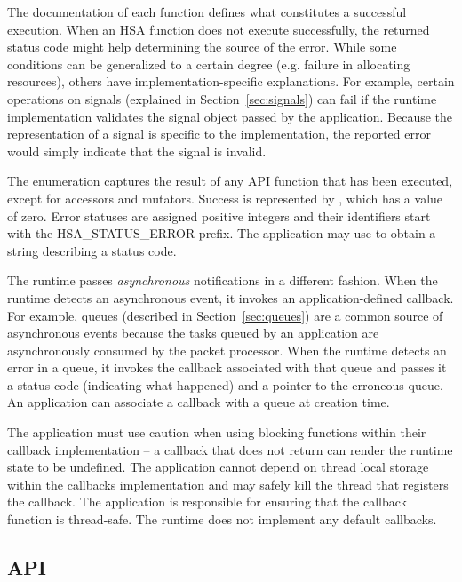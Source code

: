 \documentclass[final,oneside]{book}
\newcommand{\reftyp}[1]{#1}
\newcommand{\refenu}[1]{\reftyp{#1}}
\begin{document}
The documentation of each function defines what constitutes a successful
execution. When an HSA function does not execute successfully, the returned
status code might help determining the source of the error. While some
conditions can be generalized to a certain degree (e.g. failure in allocating
resources), others have implementation-specific explanations. For
example, certain operations on signals (explained in Section~\ref{sec:signals})
can fail if the runtime implementation validates the signal object passed by
the application. Because the representation of a signal is specific to the
implementation, the reported error would simply indicate that the signal is
invalid.

The  enumeration captures the result of any API function
that has been executed, except for accessors and mutators. Success is
represented by , which has a value of zero. Error
statuses are assigned positive integers and their identifiers start with the
\refenu{HSA_STATUS_ERROR} prefix. The application may use
 to obtain a string describing a status code.

The runtime passes \textit{asynchronous} notifications in a different fashion.
When the runtime detects an asynchronous event, it invokes an
application-defined callback. For example, queues (described in
Section~\ref{sec:queues}) are a common source of asynchronous events because the
tasks queued by an application are asynchronously consumed by the packet
processor. When the runtime detects an error in a queue, it invokes the callback
associated with that queue and passes it a status code (indicating what
happened) and a pointer to the erroneous queue. An application can associate a
callback with a queue at creation time.

The application must use caution when using blocking functions within their
callback implementation -- a callback that does not return can render the
runtime state to be undefined. The application cannot depend on thread local
storage within the callbacks implementation and may safely kill the thread that
registers the callback. The application is responsible for ensuring that
the callback function is thread-safe. The runtime does not implement any default
callbacks.

\subsection{API}

\end{document}
